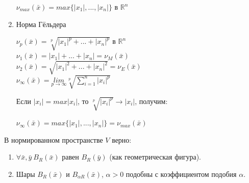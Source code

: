 \begin{enumerate}
    \begin{center}
        $\nu_{max}(\bar x) = max\{|x_1|,...,|x_n|\}$ в $\mathbb{R}^n$\\\end{center}
    \item Норма Гёльдера
    \begin{center}$\nu_p(\bar x) = \sqrt[p]{|x_1|^p+...+|x_n|^p}$ в $\mathbb{R}^n$\\
        $\nu_1(\bar x) = |x_1|+...+|x_n| = \nu_M(\bar x)$\\ 
        $\nu_2(\bar x) = \sqrt{|x_1|^2+...+|x_n|^2} = \nu_E(\bar x)$\\
        $\nu_{\infty}(\bar x) = \underset{p \to \infty}{lim}\sqrt[p]{\sum\limits_{i=1}^n |x_i|^p}$\end{center}
    Если $|x_i| = max |x_i|$, то $\sqrt[p]{|x_i|^p} \to |x_i|$, получим:
    \begin{center}$\nu_{\infty}(\bar x) = max \{|x_1|,...,|x_n|\} = \nu_{max}(\bar x)$\end{center}
\end{enumerate}
\begin{statement}
    В нормированном пространстве $V$ верно:\begin{enumerate}
        \item $\forall \bar x, \bar y ~B_R(\bar x)$ равен $B_R(\bar y)$ (как геометрическая фигура).
        \item Шары $B_R(\bar x)$ и $ B_{\alpha R}(\bar x)$, $\alpha > 0$ подобны с коэффициентом подобия $\alpha$. 
    \end{enumerate}
\end{statement}
